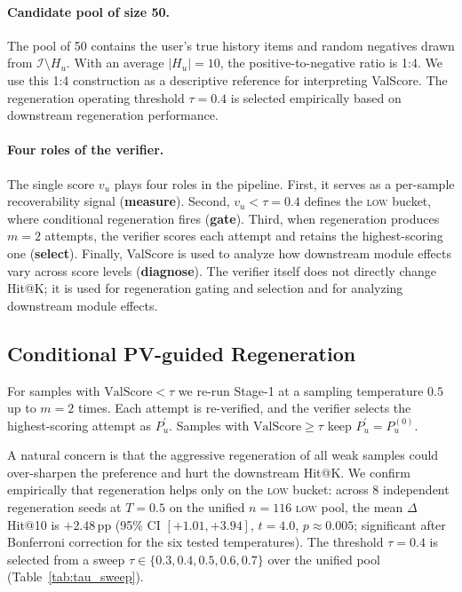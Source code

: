 \documentclass[11pt]{article}
\begin{document}
\paragraph{Candidate pool of size 50.}
The pool of 50 contains the user's true history items and random negatives drawn from $\mathcal{I} \setminus H_u$. With an average $|H_u|=10$, the positive-to-negative ratio is 1:4. We use this 1:4 construction as a descriptive reference for interpreting ValScore. The regeneration operating threshold $\tau=0.4$ is selected empirically based on downstream regeneration performance.

\paragraph{Four roles of the verifier.}
The single score $v_u$ plays four roles in the pipeline. First, it serves as a per-sample recoverability signal (\textbf{measure}). Second, $v_u<\tau{=}0.4$ defines the \textsc{low} bucket, where conditional regeneration fires (\textbf{gate}). Third, when regeneration produces $m{=}2$ attempts, the verifier scores each attempt and retains the highest-scoring one (\textbf{select}). Finally, ValScore is used to analyze how downstream module effects vary across score levels (\textbf{diagnose}). The verifier itself does not directly change Hit@K; it is used for regeneration gating and selection and for analyzing downstream module effects.

\subsection{Conditional PV-guided Regeneration}
\label{sec:regen}
For samples with $\mathrm{ValScore} < \tau$ we re-run Stage-1 at a sampling temperature $0.5$ up to $m{=}2$ times. Each attempt is re-verified, and the verifier selects the highest-scoring attempt as $P_u^{'}$. Samples with $\mathrm{ValScore} \ge \tau$ keep $P_u^{'} = P_u^{(0)}$.

A natural concern is that the aggressive regeneration of all weak samples could over-sharpen the preference and hurt the downstream Hit@K. We confirm empirically that regeneration helps only on the \textsc{low} bucket: across 8 independent regeneration seeds at $T{=}0.5$ on the unified $n{=}116$ \textsc{low} pool, the mean $\Delta$Hit@10 is $+2.48$\,pp (95\% CI $[+1.01, +3.94]$, $t{=}4.0$, $p{\approx}0.005$; significant after Bonferroni correction for the six tested temperatures). The threshold $\tau{=}0.4$ is selected from a sweep $\tau \in \{0.3, 0.4, 0.5, 0.6, 0.7\}$ over the unified pool (Table~\ref{tab:tau_sweep}).
\end{document}
